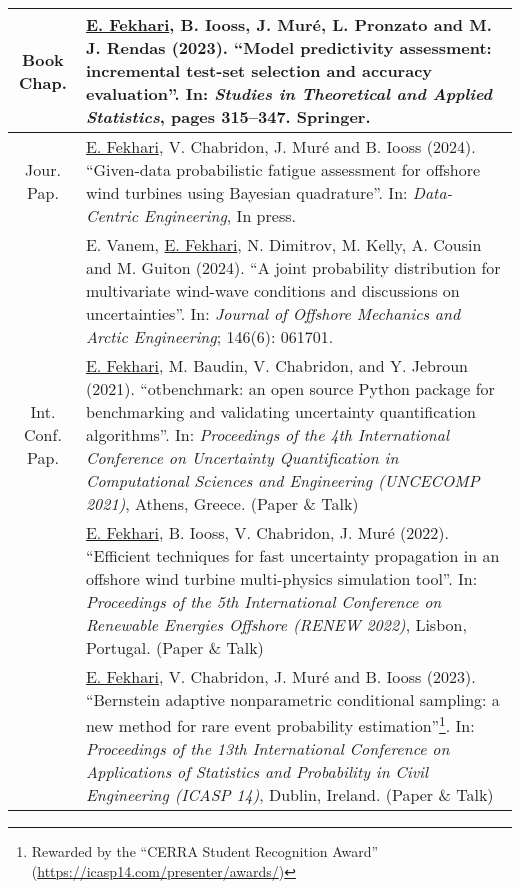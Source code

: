 
\begin{center}
    \footnotesize
    \renewcommand*{\arraystretch}{1.4}
    \begin{tabularx}{\textwidth}{c X}
        Book Chap.      & \underline{E. Fekhari}, B. Iooss, J. Mur\'{e}, L. Pronzato and M. J. Rendas (2023). 
                        ``Model predictivity assessment: incremental test-set selection and accuracy evaluation''. 
                        In: \textit{Studies in Theoretical and Applied Statistics}, pages 315--347. Springer.\\
        \hline  
        Jour. Pap.      & \underline{E. Fekhari}, V. Chabridon, J. Mur\'{e} and B. Iooss (2024).
                        ``Given-data probabilistic fatigue assessment for offshore wind turbines using Bayesian quadrature''. 
                        In: \textit{Data-Centric Engineering}, In press.\\

                        & E. Vanem, \underline{E. Fekhari}, N. Dimitrov, M. Kelly, A. Cousin and M. Guiton (2024).
                        ``A joint probability distribution for multivariate wind-wave conditions and discussions on uncertainties''.
                        In: \textit{Journal of Offshore Mechanics and Arctic Engineering}; 146(6): 061701.\\
        \hline
\shortstack{Int. Conf.\\Pap.} & \underline{E. Fekhari}, M. Baudin, V. Chabridon, and Y. Jebroun (2021). 
                                ``otbenchmark: an open source Python package for benchmarking and validating uncertainty quantification algorithms''. 
                                In: \textit{Proceedings of the 4th International Conference on Uncertainty Quantification in Computational Sciences and Engineering (UNCECOMP 2021)}, Athens, Greece. (Paper \& Talk)\\
                    & \underline{E. Fekhari}, B. Iooss, V. Chabridon, J. Mur\'{e} (2022). 
                    ``Efficient techniques for fast uncertainty propagation in an offshore wind turbine multi-physics simulation tool''.
                    In: \textit{Proceedings of the 5th International Conference on Renewable Energies Offshore (RENEW 2022)}, Lisbon, Portugal. (Paper \& Talk)\\
        
                    & \underline{E. Fekhari}, V. Chabridon, J. Mur\'{e} and B. Iooss (2023). 
                    ``Bernstein adaptive nonparametric conditional sampling: a new method for rare event probability estimation''\footnote{Rewarded by the ``CERRA Student Recognition Award'' (\url{https://icasp14.com/presenter/awards/})}.
                    In: \textit{Proceedings of the 13th International Conference on Applications of Statistics and Probability in Civil Engineering (ICASP 14)}, Dublin, Ireland. (Paper \& Talk)\\
        

\end{tabularx}
\end{center}
